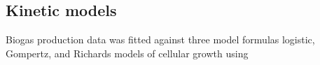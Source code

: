\subsection{Kinetic models}
Biogas production data was fitted against three model formulas logistic, Gompertz, and
Richards models of cellular growth using  